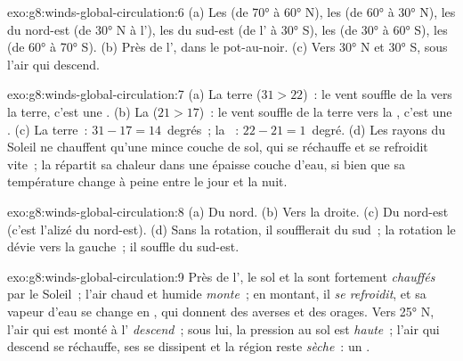 \begin{solution}{exo:g8:winds-global-circulation:6}
(a) Les  (de \ang{70} à \ang{60} N), les 
(de \ang{60} à \ang{30} N), les  du nord-est (de \ang{30} N à
l'), les  du sud-est (de l' à \ang{30} S), les  (de \ang{30} à \ang{60} S), les  (de \ang{60}
à \ang{70} S). (b) Près de l', dans le pot-au-noir. (c) Vers
\ang{30} N et \ang{30} S, sous l'air qui descend.
\end{solution}

\begin{solution}{exo:g8:winds-global-circulation:7}
(a) La terre ($31 > 22$)~: le vent souffle de la  vers la terre, c'est
une . (b) La  ($21 > 17$)~: le vent souffle de la terre
vers la , c'est une . (c) La terre~: $31 - 17 = 14$~degrés~;
la ~: $22 -
21 = 1$~degré. (d) Les rayons du Soleil ne chauffent qu'une mince couche de
sol, qui se réchauffe et se refroidit vite~; la  répartit sa chaleur
dans une épaisse couche d'eau, si bien que sa température change à peine
entre le jour et la nuit.
\end{solution}

\begin{solution}{exo:g8:winds-global-circulation:8}
(a) Du nord. (b) Vers la droite. (c) Du nord-est (c'est l'alizé du
nord-est). (d) Sans la rotation, il soufflerait du sud~; la rotation le
dévie vers la gauche~; il souffle du sud-est.
\end{solution}

\begin{solution}{exo:g8:winds-global-circulation:9}
Près de l', le sol et la  sont fortement \emph{chauffés} par le
Soleil~; l'air chaud et humide \emph{monte}~; en montant, il \emph{se refroidit},
et sa vapeur d'eau se change en \emph{}, qui donnent des averses et
des orages. Vers \ang{25} N, l'air qui est monté à l'
\emph{descend}~; sous lui, la pression au sol est \emph{haute}~; l'air qui
descend se réchauffe, ses  se dissipent et la région reste
\emph{sèche}~: un .
\end{solution}

